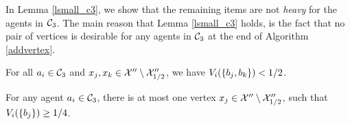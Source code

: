 In Lemma \ref{lsmall_c3}, we show that the remaining items are not \emph{heavy} for the agents in $\mathcal{C}_3$. The main reason that Lemma \ref{lsmall_c3} holds, is the fact that no pair of vertices is desirable for any agents in $\mathcal{C}_3$ at the end of Algorithm \ref{addvertex}. 
\begin{lemma}
\label{lsmall_c3}
For all $a_i \in \mathcal{C}_3$ and $x_j,x_k \in \mathcal{X}'' \setminus \mathcal{X}''_{1/2}$, we have  $V_i(\{b_j,b_k\}) < {1/2}$.
\end{lemma}

\begin{corollary}
\label{small_c3}
For any agent $a_i \in \mathcal{C}_3$, there is at most one vertex $x_j \in \mathcal{X}'' \setminus \mathcal{X}''_{1/2}$, such that $V_i(\{b_j\}) \geq {1/4}$.
\end{corollary}


